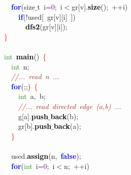 {{\mbox{}\ \ \textbf{\textcolor{Blue}{for}}\textcolor{BrickRed}{(}\textcolor{TealBlue}{size$\_$t}\ i\textcolor{BrickRed}{=}\textcolor{Purple}{0}\textcolor{BrickRed}{;}\ i\textcolor{BrickRed}{$<$}gr\textcolor{BrickRed}{[}v\textcolor{BrickRed}{].}\textbf{\textcolor{Black}{size}}\textcolor{BrickRed}{();}\ \textcolor{BrickRed}{++}i\textcolor{BrickRed}{)} \\
\mbox{}\ \ \ \ \textbf{\textcolor{Blue}{if}}\textcolor{BrickRed}{(!}used\textcolor{BrickRed}{[}\ gr\textcolor{BrickRed}{[}v\textcolor{BrickRed}{][}i\textcolor{BrickRed}{]}\ \textcolor{BrickRed}{])} \\
\mbox{}\ \ \ \ \ \ \textbf{\textcolor{Black}{dfs2}}\textcolor{BrickRed}{(}gr\textcolor{BrickRed}{[}v\textcolor{BrickRed}{][}i\textcolor{BrickRed}{]);} \\
\mbox{}\textcolor{Red}{\}} \\
\mbox{}\  \\
\mbox{}\textcolor{ForestGreen}{int}\ \textbf{\textcolor{Black}{main}}\textcolor{BrickRed}{()}\ \textcolor{Red}{\{} \\
\mbox{}\ \ \textcolor{ForestGreen}{int}\ n\textcolor{BrickRed}{;} \\
\mbox{}\ \ \textit{\textcolor{Brown}{//...\ read\ n\ ...}} \\
\mbox{}\ \ \textbf{\textcolor{Blue}{for}}\textcolor{BrickRed}{(;;)}\ \textcolor{Red}{\{} \\
\mbox{}\ \ \ \ \textcolor{ForestGreen}{int}\ a\textcolor{BrickRed}{,}\ b\textcolor{BrickRed}{;} \\
\mbox{}\ \ \ \ \textit{\textcolor{Brown}{//...\ read\ directed\ edge\ (a,b)\ ...}} \\
\mbox{}\ \ \ \ g\textcolor{BrickRed}{[}a\textcolor{BrickRed}{].}\textbf{\textcolor{Black}{push$\_$back}}\textcolor{BrickRed}{(}b\textcolor{BrickRed}{);} \\
\mbox{}\ \ \ \ gr\textcolor{BrickRed}{[}b\textcolor{BrickRed}{].}\textbf{\textcolor{Black}{push$\_$back}}\textcolor{BrickRed}{(}a\textcolor{BrickRed}{);} \\
\mbox{}\ \ \textcolor{Red}{\}} \\
\mbox{}\  \\
\mbox{}\ \ used\textcolor{BrickRed}{.}\textbf{\textcolor{Black}{assign}}\textcolor{BrickRed}{(}n\textcolor{BrickRed}{,}\ \textbf{\textcolor{Blue}{false}}\textcolor{BrickRed}{);} \\
\mbox{}\ \ \textbf{\textcolor{Blue}{for}}\textcolor{BrickRed}{(}\textcolor{ForestGreen}{int}\ i\textcolor{BrickRed}{=}\textcolor{Purple}{0}\textcolor{BrickRed}{;}\ i\textcolor{BrickRed}{$<$}n\textcolor{BrickRed}{;}\ \textcolor{BrickRed}{++}i\textcolor{BrickRed}{)} \\
}}
